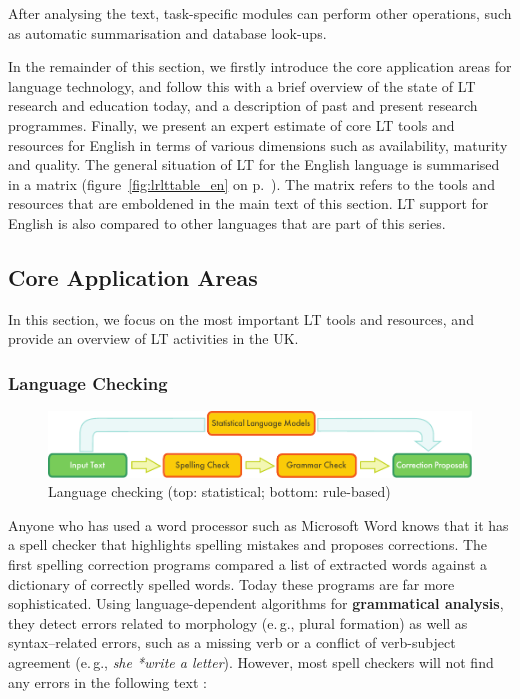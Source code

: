 \documentclass[]{../../metanetpaper}
\begin{document}
\begin{multicols}{2}
After analysing the text, task-specific modules can perform other operations, such as automatic summarisation and database look-ups.

In the remainder of this section, we firstly introduce the core application areas for language technology, and follow this with a brief overview of the state of LT research and education today, and a description of past and present research programmes. Finally, we present an expert estimate of core LT tools and resources for English in terms of various dimensions such as availability, maturity and quality. The general situation of LT for the English language is summarised in a matrix (figure~\ref{fig:lrlttable_en} on p.~\pageref{fig:lrlttable_en}). The matrix refers to the tools and resources that are emboldened in the main text of this section. LT support for English is also compared to other languages that are part of this series.

\subsection{Core Application Areas}

In this section, we focus on the most important LT tools and resources, and provide an overview of LT activities in the UK.

\subsubsection{Language Checking}

\begin{figure}[t]
  \center
  \includegraphics[width=\textwidth]{../_media/english/language_checking}
  \caption{Language checking (top: statistical; bottom: rule-based)}
  \label{fig:langcheckingaarch_en}
\end{figure}

Anyone who has used a word processor such as Microsoft Word knows that it has a spell checker that highlights spelling mistakes and proposes corrections. The first spelling correction programs compared a list of extracted words against a dictionary of correctly spelled words. Today these programs are far more sophisticated. Using language-dependent algorithms for \textbf{grammatical analysis}, they detect errors related to morphology (e.\,g., plural formation) as well as syntax–related errors, such as a missing verb or a conflict of verb-subject agreement (e.\,g., \textit{she *write a letter}). However, most spell checkers will not find any errors in the following text \cite{zar1}:


\end{multicols}
\end{document}
